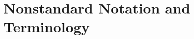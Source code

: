 \documentclass{article}
\theoremstyle{plain}
\theoremstyle{plain}
\begin{document}

\section{Nonstandard Notation and Terminology}
\end{document}
